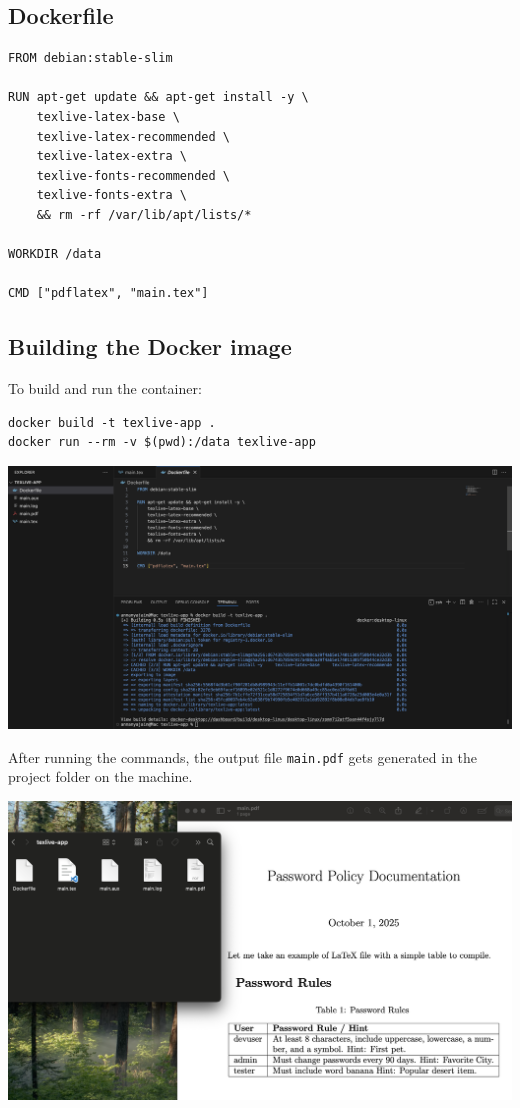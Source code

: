 \subsection{Dockerfile}
\begin{verbatim}
FROM debian:stable-slim

RUN apt-get update && apt-get install -y \
    texlive-latex-base \
    texlive-latex-recommended \
    texlive-latex-extra \
    texlive-fonts-recommended \
    texlive-fonts-extra \
    && rm -rf /var/lib/apt/lists/*

WORKDIR /data

CMD ["pdflatex", "main.tex"]
\end{verbatim}

\subsection{Building the Docker image}
To build and run the container:

\begin{verbatim}
docker build -t texlive-app .
docker run --rm -v $(pwd):/data texlive-app
\end{verbatim}

\begin{center}
  \includegraphics[width=1.0\textwidth]{png/texlive_build.png}
\end{center}

\noindent After running the commands, the output file \texttt{main.pdf} 
gets generated in the project folder on the machine. \medskip

\begin{center}
  \includegraphics[width=1.0\textwidth]{png/main_pdf generated.png}
\end{center}


